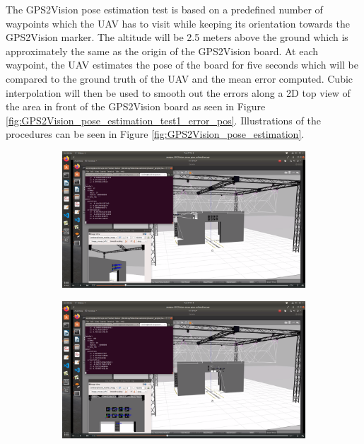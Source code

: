 \documentclass[../Head/report.tex]{subfiles}
\begin{document}
The GPS2Vision pose estimation test is based on a predefined number of waypoints which the UAV has to visit while keeping its orientation towards the GPS2Vision marker. The altitude will be 2.5 meters above the ground which is approximately the same as the origin of the GPS2Vision board. At each waypoint, the UAV estimates the pose of the board for five seconds which will be compared to the ground truth of the UAV and the mean error computed. Cubic interpolation will then be used to smooth out the errors along a 2D top view of the area in front of the GPS2Vision board as seen in Figure \ref{fig:GPS2Vision_pose_estimation_test1_error_pos}. Illustrations of the procedures can be seen in Figure \ref{fig:GPS2Vision_pose_estimation}. 

\begin{figure}[H]
    \centering
    \begin{subfigure}[t]{.30\textwidth}
        \centering
        \includegraphics[width=\textwidth]{../Figures/GPS2Vision_pose_estimation_test/gps2vision_pose_estimation_one.png}
        \caption{}
        \label{fig:GPS2Vision_pose_estimation_one}
    \end{subfigure}
    \hspace{0.2em}
    \begin{subfigure}[t]{.30\textwidth}
        \centering
        \includegraphics[width=\textwidth]{../Figures/GPS2Vision_pose_estimation_test/gps2vision_pose_estimation_two.png}

\end{subfigure}
\end{figure}
\end{document}
